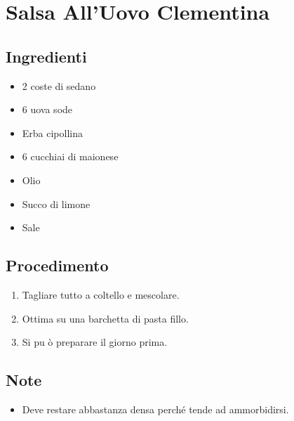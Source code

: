 \section{Salsa All'Uovo Clementina}
\subsection{Ingredienti}
\begin{itemize}
\item 2 coste di sedano  
\item 6 uova sode  
\item Erba cipollina  
\item 6 cucchiai di maionese  
\item Olio  
\item Succo di limone  
\item Sale
\end{itemize}
\subsection{Procedimento}
\begin{enumerate}
\item  Tagliare tutto a coltello e mescolare.  
\item  Ottima su una barchetta di pasta fillo.  
\item  Si pu ò preparare il giorno prima.
\end{enumerate}
\subsection{Note}
\begin{itemize}
\item Deve restare abbastanza densa perché tende ad ammorbidirsi.
\end{itemize}
